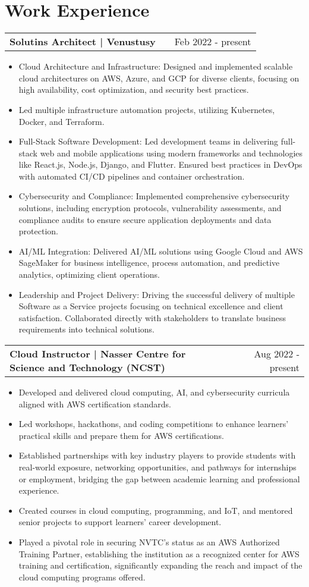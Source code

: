 \documentclass[a4paper,11pt]{article}
\makeatletter
\newenvironment{joblong}[2]
    {
    \begin{tabularx}{\linewidth}{@{}l X r@{}}
    \textbf{#1} & \hfill &  #2 \\[3.75pt]
    \end{tabularx}
    \begin{minipage}[t]{\linewidth}
    \begin{itemize}[nosep,after=\strut, leftmargin=1em, itemsep=3pt,label=--]
    }
    {
    \end{itemize}
    \end{minipage}    
    }
\makeatother
\begin{document}
\section{Work Experience}

\begin{joblong}{ Solutins Architect | Venustusy}{Feb 2022 - present}
\item Cloud Architecture and Infrastructure: Designed and implemented scalable cloud architectures on AWS, Azure, and GCP for diverse clients, focusing on high availability, cost optimization, and security best practices. 
\item Led multiple infrastructure automation projects, utilizing Kubernetes, Docker, and Terraform.
\item Full-Stack Software Development: Led development teams in delivering full-stack web and mobile applications using modern frameworks and technologies like React.js, Node.js, Django, and Flutter. Ensured best practices in DevOps with automated CI/CD pipelines and container orchestration.
\item Cybersecurity and Compliance: Implemented comprehensive cybersecurity solutions, including encryption protocols, vulnerability assessments, and compliance audits to ensure secure application deployments and data protection.
\item AI/ML Integration: Delivered AI/ML solutions using Google Cloud and AWS SageMaker for business intelligence, process automation, and predictive analytics, optimizing client operations.
\item Leadership and Project Delivery: Driving the successful delivery of multiple Software as a Service projects focusing on technical excellence and client satisfaction. Collaborated directly with stakeholders to translate business requirements into technical solutions.
\end{joblong}


\begin{joblong}{Cloud Instructor | Nasser Centre for Science and Technology (NCST)}{Aug 2022 - present}
\item Developed and delivered cloud computing, AI, and cybersecurity curricula aligned with AWS certification standards.
\item Led workshops, hackathons, and coding competitions to enhance learners' practical skills and prepare them for AWS certifications.
\item Established partnerships with key industry players to provide students with real-world exposure, networking opportunities, and pathways for internships or employment, bridging the gap between academic learning and professional experience.
\item Created courses in cloud computing, programming, and IoT, and mentored senior projects to support learners' career development.
\item Played a pivotal role in securing NVTC’s status as an AWS Authorized Training Partner, establishing the institution as a recognized center for AWS training and certification, significantly expanding the reach and impact of the cloud computing programs offered.

\end{joblong}
\end{document}
